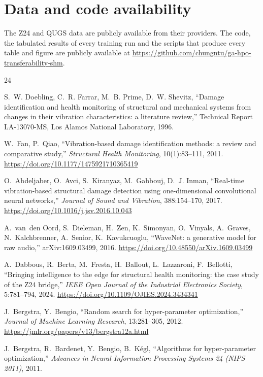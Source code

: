 \documentclass[11pt,a4paper]{article}
\begin{document}
\section*{Data and code availability}
The Z24 and QUGS data are publicly available from their providers. The code, the
tabulated results of every training run and the scripts that produce every table
and figure are publicly available at
\url{https://github.com/chungntu/ga-hpo-transferability-shm}.

\begin{thebibliography}{24}

S.~W. Doebling, C.~R. Farrar, M.~B. Prime, D.~W. Shevitz,
``Damage identification and health monitoring of structural and mechanical systems from changes in their vibration characteristics: a literature review,''
Technical Report LA-13070-MS, Los Alamos National Laboratory, 1996.

W.~Fan, P.~Qiao,
``Vibration-based damage identification methods: a review and comparative study,''
\emph{Structural Health Monitoring}, 10(1):83--111, 2011.
\url{https://doi.org/10.1177/1475921710365419}

O.~Abdeljaber, O.~Avci, S.~Kiranyaz, M.~Gabbouj, D.~J. Inman,
``Real-time vibration-based structural damage detection using one-dimensional convolutional neural networks,''
\emph{Journal of Sound and Vibration}, 388:154--170, 2017.
\url{https://doi.org/10.1016/j.jsv.2016.10.043}

A.~van~den Oord, S.~Dieleman, H.~Zen, K.~Simonyan, O.~Vinyals, A.~Graves, N.~Kalchbrenner, A.~Senior, K.~Kavukcuoglu,
``WaveNet: a generative model for raw audio,''
arXiv:1609.03499, 2016.
\url{https://doi.org/10.48550/arXiv.1609.03499}

A.~Dabbous, R.~Berta, M.~Fresta, H.~Ballout, L.~Lazzaroni, F.~Bellotti,
``Bringing intelligence to the edge for structural health monitoring: the case study of the Z24 bridge,''
\emph{IEEE Open Journal of the Industrial Electronics Society}, 5:781--794, 2024.
\url{https://doi.org/10.1109/OJIES.2024.3434341}

J.~Bergstra, Y.~Bengio,
``Random search for hyper-parameter optimization,''
\emph{Journal of Machine Learning Research}, 13:281--305, 2012.
\url{https://jmlr.org/papers/v13/bergstra12a.html}

J.~Bergstra, R.~Bardenet, Y.~Bengio, B.~K\'egl,
``Algorithms for hyper-parameter optimization,''
\emph{Advances in Neural Information Processing Systems 24 (NIPS 2011)}, 2011.


\end{thebibliography}
\end{document}
